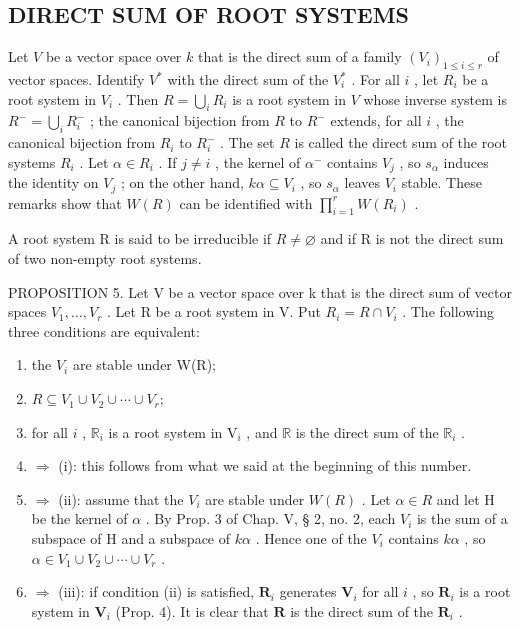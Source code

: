 \subsection{DIRECT SUM OF ROOT SYSTEMS}

Let \(V\) be a vector space over \(k\) that is the direct sum of a family \((V_i)_{1 \leqslant i \leqslant r}\) of vector spaces. Identify \(V^*\) with the direct sum of the \(V_i^*\) . For all \(i\) , let \(R_i\) be a root system in \(V_i\) . Then \(R = \bigcup_i R_i\) is a root system in \(V\) whose inverse system is \(R^- = \bigcup_i R_i^-\) ; the canonical bijection from \(R\) to \(R^-\) extends, for all \(i\) , the canonical bijection from \(R_i\) to \(R_i^-\) . The set \(R\) is called the direct sum of the root systems \(R_i\) . Let \(\alpha \in R_i\) . If \(j \neq i\) , the kernel of \(\alpha^-\) contains \(V_j\) , so \(s_\alpha\) induces the identity on \(V_j\) ; on the other hand, \(k\alpha \subseteq V_i\) , so \(s_\alpha\) leaves \(V_i\) stable. These remarks show that \(W(R)\) can be identified with \(\prod_{i=1}^{r} W(R_i)\) .

A root system R is said to be irreducible if \(R \neq \varnothing\) and if R is not the direct sum of two non-empty root systems.

PROPOSITION 5. Let V be a vector space over k that is the direct sum of vector spaces \(V_{1}, \ldots, V_{r}\) . Let R be a root system in V. Put \(R_{i} = R \cap V_{i}\) . The following three conditions are equivalent:

\begin{enumerate}
\def\labelenumi{(\roman{enumi})}
\item
  the \(V_{i}\) are stable under W(R);
\item
  \(R \subseteq V_{1} \cup V_{2} \cup \cdots \cup V_{r};\)
\item
  for all \(i\) , \(\mathbb{R}_i\) is a root system in \(\mathrm{V}_i\) , and \(\mathbb{R}\) is the direct sum of the \(\mathbb{R}_i\) .
\item
  \(\Longrightarrow\) (i): this follows from what we said at the beginning of this number.
\item
  \(\Longrightarrow\) (ii): assume that the \(V_{i}\) are stable under \(W(R)\) . Let \(\alpha \in R\) and let H be the kernel of \(\alpha\) . By Prop. 3 of Chap. V, § 2, no. 2, each \(V_{i}\) is the sum of a subspace of H and a subspace of \(k\alpha\) . Hence one of the \(V_{i}\) contains \(k\alpha\) , so \(\alpha \in V_{1} \cup V_{2} \cup \cdots \cup V_{r}\) .
\item
  \(\Longrightarrow\) (iii): if condition (ii) is satisfied, \(\mathbf{R}_i\) generates \(\mathbf{V}_i\) for all \(i\) , so \(\mathbf{R}_i\) is a root system in \(\mathbf{V}_i\) (Prop. 4). It is clear that \(\mathbf{R}\) is the direct sum of the \(\mathbf{R}_i\) .
\end{enumerate}

